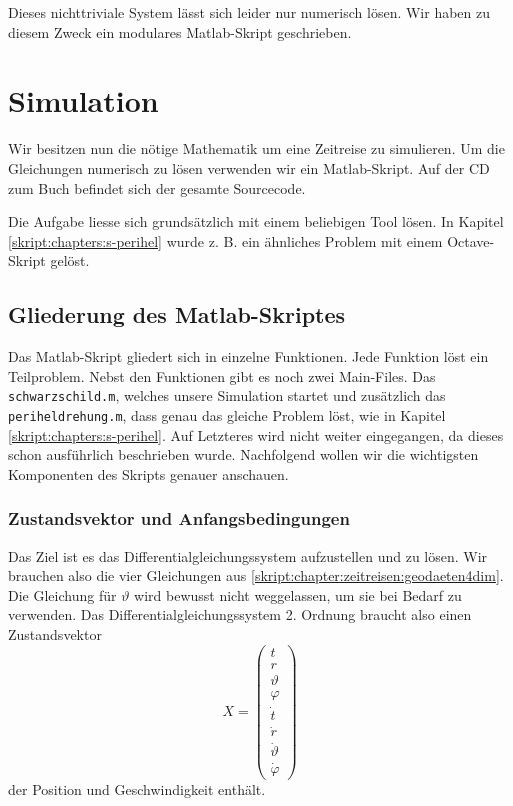 \begin{refsection}
	Dieses nichttriviale System lässt sich leider nur numerisch lösen. Wir haben zu diesem Zweck ein modulares Matlab-Skript geschrieben. 
		
	\section{Simulation}\label{skript:chapter:zeitreisen:simulation}
    
    Wir besitzen nun die nötige Mathematik um eine Zeitreise zu simulieren. Um die Gleichungen numerisch zu lösen verwenden wir ein Matlab-Skript. Auf der CD zum Buch befindet sich der gesamte Sourcecode. 
    
    Die Aufgabe liesse sich grundsätzlich mit einem beliebigen Tool lösen. In Kapitel \ref{skript:chapters:s-perihel} wurde z. B. ein ähnliches Problem mit einem Octave-Skript gelöst. 

    \subsection{Gliederung des Matlab-Skriptes}
    Das Matlab-Skript gliedert sich in einzelne Funktionen. Jede Funktion löst ein Teilproblem. Nebst den Funktionen gibt es noch zwei Main-Files. Das \texttt{schwarzschild.m}, welches unsere Simulation startet und zusätzlich das \texttt{periheldrehung.m}, dass genau das gleiche Problem löst, wie in Kapitel \ref{skript:chapters:s-perihel}. Auf Letzteres wird nicht weiter eingegangen, da dieses schon ausführlich beschrieben wurde.
    Nachfolgend wollen wir die wichtigsten Komponenten des Skripts genauer anschauen.

    \subsubsection{Zustandsvektor und Anfangsbedingungen}
    Das Ziel ist es das Differentialgleichungssystem aufzustellen und zu lösen. Wir brauchen also die vier Gleichungen aus \ref{skript:chapter:zeitreisen:geodaeten4dim}. Die Gleichung für $\vartheta$ wird bewusst nicht weggelassen, um sie bei Bedarf zu verwenden. 
    Das Differentialgleichungssystem 2. Ordnung braucht also einen Zustandsvektor
    \[
    X=\begin{pmatrix}
    t\\r\\\vartheta\\\varphi \\\dot t\\\dot r\\\dot \vartheta\\\dot\varphi
    \end{pmatrix}
    \]
    der Position und Geschwindigkeit enthält.
    

\end{refsection}
